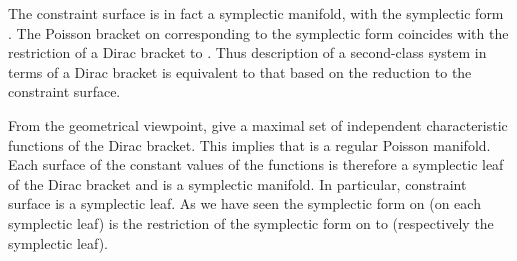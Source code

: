 \documentclass[a4paper,11pt]{amsart}
\numberwithin{thm}{section} %
\numberwithin{equation}{section} %
\numberwithin{figure}{section} %
\providecommand{\pb}[2]{\left\{{}#1{},{}#2{}\right\}}
\renewcommand{\:}{{\rm\, :\,}}
\def\manM{{\mathcal M}}
\begin{document}
The constraint surface \myHighlight{$\Sigma$}\coordHE{} is in fact a symplectic manifold,
with the symplectic form \myHighlight{$\omega^\Sigma\equiv \omega\big|_{\Sigma}$}\coordHE{}.
The Poisson bracket on \myHighlight{$\Sigma$}\coordHE{} corresponding to the symplectic form
\myHighlight{$\omega^\Sigma$}\coordHE{} coincides with the restriction
\myHighlight{$\pb{}{}^D_\manM{\bigr|}_\Sigma$}\coordHE{} of a Dirac bracket to \myHighlight{$\Sigma$}\coordHE{}.
Thus description of a second-class system in terms
of a Dirac bracket is equivalent to that based on the
reduction to the constraint surface.

From the geometrical viewpoint, \myHighlight{$\theta_\alpha$}\coordHE{} give a
maximal set of independent characteristic functions of the Dirac
bracket.  This implies that \myHighlight{$\manM$}\coordHE{} is a regular Poisson manifold.
Each surface of the constant values of the functions
\myHighlight{$\theta_\alpha$}\coordHE{} is therefore a symplectic leaf of the Dirac bracket
and is a symplectic manifold. In particular, constraint surface
\myHighlight{$\Sigma$}\coordHE{} is a symplectic leaf.  As we have seen the symplectic form on
\myHighlight{$\Sigma$}\coordHE{} (on each symplectic leaf) is the restriction
\myHighlight{$\omega|_{\Sigma}$}\coordHE{} of the symplectic form \myHighlight{$\omega$}\coordHE{} on \myHighlight{$\manM$}\coordHE{} to
\myHighlight{$\Sigma \subset \manM$}\coordHE{} (respectively the symplectic leaf).
\end{document}
